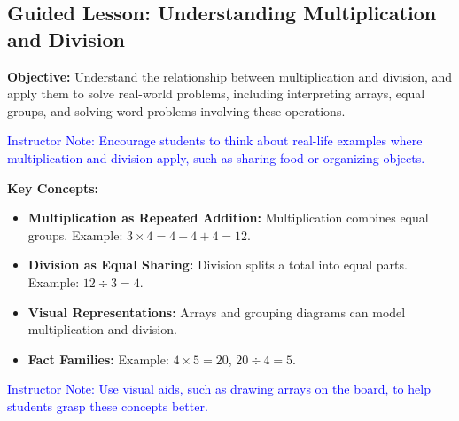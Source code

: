 \documentclass[12pt]{article}
\title{}
\date{}
\begin{document}
\subsection*{Guided Lesson: Understanding Multiplication and Division}
\onehalfspacing

\begin{tcolorbox}[colframe=black!40, colback=gray!5, 
coltitle=black, colbacktitle=black!20, fonttitle=\bfseries\Large, 
title=Learning Objective, halign title=center, left=5pt, right=5pt, top=5pt, bottom=15pt]
\textbf{Objective:} Understand the relationship between multiplication and division, and apply them to solve real-world problems, including interpreting arrays, equal groups, and solving word problems involving these operations.

\textcolor{blue}{Instructor Note: Encourage students to think about real-life examples where multiplication and division apply, such as sharing food or organizing objects.}
\end{tcolorbox}

\begin{tcolorbox}[colframe=black!60, colback=white, 
coltitle=black, colbacktitle=black!15, fonttitle=\bfseries\Large, 
title=Key Concepts and Vocabulary, halign title=center, left=10pt, right=10pt, top=10pt, bottom=15pt]
\textbf{Key Concepts:}
\begin{itemize}
    \item \textbf{Multiplication as Repeated Addition:} Multiplication combines equal groups. Example: $3 \times 4 = 4 + 4 + 4 = 12$.
    \item \textbf{Division as Equal Sharing:} Division splits a total into equal parts. Example: $12 \div 3 = 4$.
    \item \textbf{Visual Representations:} Arrays and grouping diagrams can model multiplication and division.
    \item \textbf{Fact Families:} Example: $4 \times 5 = 20$, $20 \div 4 = 5$.
\end{itemize}

\textcolor{blue}{Instructor Note: Use visual aids, such as drawing arrays on the board, to help students grasp these concepts better.}
\end{tcolorbox}
\end{document}
